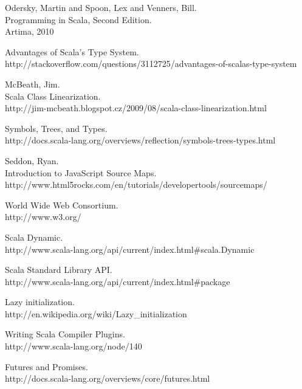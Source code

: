 \begin{thebibliography}{99}
	{\sc Odersky,} Martin and {\sc Spoon,} Lex and {\sc Venners,} Bill.\\  Programming in Scala, Second Edition.\\
	Artima, 2010
	
	Advantages of Scala's Type System.\\
	http://stackoverflow.com/questions/3112725/advantages-of-scalas-type-system
	
  {\sc McBeath}, Jim.\\
	Scala Class Linearization.\\
	http://jim-mcbeath.blogspot.cz/2009/08/scala-class-linearization.html
	
	Symbols, Trees, and Types.\\
	http://docs.scala-lang.org/overviews/reflection/symbols-trees-types.html
	
  {\sc Seddon,} Ryan.\\
	Introduction to JavaScript Source Maps.\\
  http://www.html5rocks.com/en/tutorials/developertools/sourcemaps/
	
  World Wide Web Consortium.\\
	http://www.w3.org/
	
  Scala Dynamic.\\
	http://www.scala-lang.org/api/current/index.html\#scala.Dynamic
	
	Scala Standard Library API.\\
  http://www.scala-lang.org/api/current/index.html\#package
	
  Lazy initialization.\\
	http://en.wikipedia.org/wiki/Lazy\_initialization
	
  Writing Scala Compiler Plugins.\\
  http://www.scala-lang.org/node/140
	
  Futures and Promises.\\
  http://docs.scala-lang.org/overviews/core/futures.html
		
\end{thebibliography}